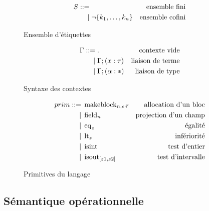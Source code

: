 \begin{figure}
\begin{align*}
  S ::=& \;
    & \text{ensemble fini}
  \\ |& \;  \lnot \{ k_1, \ldots, k_n \}
    & \text{ensemble cofini}
\end{align*}
\caption{Ensemble d'étiquettes}
\end{figure}

\begin{figure}
\begin{align*}
  \Gamma ::=& \; .
    & \text{contexte vide}
  \\ |& \; \Gamma; (x : \tau)
    & \text{liaison de terme}
  \\ |& \; \Gamma; (\alpha : *)
    & \text{liaison de type}
\end{align*}
\caption{Syntaxe des contextes}
\end{figure}

\begin{figure}
\begin{align*}
  prim ::=& \; \operatorname{makeblock}_{n,\epsilon \, \vec{\tau}}
    & \text{allocation d'un bloc}
  \\ |& \; \operatorname{field}_{n}
    & \text{projection d'un champ}
  \\ |& \; \operatorname{eq}_{z}
    & \text{égalité}
  \\ |& \; \operatorname{lt}_{z}
    & \text{infériorité}
  \\ |& \; \operatorname{isint}
    & \text{test d'entier}
  \\ |& \; \operatorname{isout}_{[z1,z2]}
    & \text{test d'intervalle}
\end{align*}
\caption{Primitives du langage}
\end{figure}

\pagebreak

\subsection{Sémantique opérationnelle}

